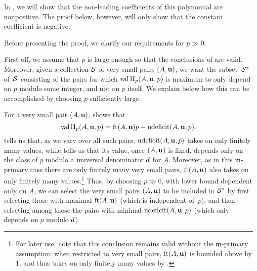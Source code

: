 \documentclass{amsart}
\begin{document}
\begin{remark}
   In , we will show that the non-leading coefficients of this polynomial are nonpositive.
   The proof below, however, will only show that the constant coefficient is negative.
\end{remark}

Before presenting the proof, we clarify our requirements for $p\gg 0$.

\begin{remark}
   \label{p large m-primary: R}
   First off, we assume that $p$ is large enough so that the conclusions of  are valid.
   Moreover, given a collection $\S$ of very small pairs $(A,\vv{u})$, we want the subset~$\S^*$ of~$\S$ consisting of the pairs for which $\val \IP_p(A,\vv{u},p)$ is maximum to only depend on $p$ modulo some integer, and not on $p$ itself.
   We explain below how this can be accomplished by choosing $p$ sufficiently large.

   For a very small pair $(A,\vv{u})$,  shows that
   \[ \val \IP_p(A,\vv{u},p) = \ft{A}{\vv{u}}p-\udeficit(A,\vv{u},p).\]
    tells us that, as we vary over all such pairs, $\udeficit(A,\vv{u},p)$ takes on only finitely many values, while  tells us that its value, once $(A,\vv{u})$ is fixed, depends only on the class of $p$ modulo a universal denominator $\denom$ for $A$.
   Moreover, as in this $\idealm$-primary case there are only finitely many very small pairs, $\ft{A}{\vv{u}}$ also takes on only finitely many values.\footnote{For later use, note that this conclusion remains valid without the $\idealm$-primary assumption: when restricted to very small pairs, $\ft{A}{\vv{u}}$ is bounded above by $1$, and thus takes on only finitely many values by .}
   Thus, by choosing $p\gg 0$, with lower bound dependent only on $A$, we can select the very small pairs $(A,\vv{u})$ to be included in $\S^*$ by first selecting those with maximal $\ft{A}{\vv{u}}$ (which is independent of~$p$), and then selecting among those the pairs with minimal $\udeficit(A,\vv{u},p)$ (which only depends on $p$ modulo $\denom$).
\end{remark}
\end{document}
